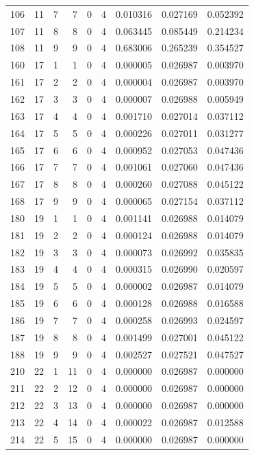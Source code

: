 \begin{longtable}{rrrrrrrrr}
106 & 11 & 7 & 7 & 0 & 4 & 0.010316 & 0.027169 & 0.052392 \\
107 & 11 & 8 & 8 & 0 & 4 & 0.063445 & 0.085449 & 0.214234 \\
108 & 11 & 9 & 9 & 0 & 4 & 0.683006 & 0.265239 & 0.354527 \\
160 & 17 & 1 & 1 & 0 & 4 & 0.000005 & 0.026987 & 0.003970 \\
161 & 17 & 2 & 2 & 0 & 4 & 0.000004 & 0.026987 & 0.003970 \\
162 & 17 & 3 & 3 & 0 & 4 & 0.000007 & 0.026988 & 0.005949 \\
163 & 17 & 4 & 4 & 0 & 4 & 0.001710 & 0.027014 & 0.037112 \\
164 & 17 & 5 & 5 & 0 & 4 & 0.000226 & 0.027011 & 0.031277 \\
165 & 17 & 6 & 6 & 0 & 4 & 0.000952 & 0.027053 & 0.047436 \\
166 & 17 & 7 & 7 & 0 & 4 & 0.001061 & 0.027060 & 0.047436 \\
167 & 17 & 8 & 8 & 0 & 4 & 0.000260 & 0.027088 & 0.045122 \\
168 & 17 & 9 & 9 & 0 & 4 & 0.000065 & 0.027154 & 0.037112 \\
180 & 19 & 1 & 1 & 0 & 4 & 0.001141 & 0.026988 & 0.014079 \\
181 & 19 & 2 & 2 & 0 & 4 & 0.000124 & 0.026988 & 0.014079 \\
182 & 19 & 3 & 3 & 0 & 4 & 0.000073 & 0.026992 & 0.035835 \\
183 & 19 & 4 & 4 & 0 & 4 & 0.000315 & 0.026990 & 0.020597 \\
184 & 19 & 5 & 5 & 0 & 4 & 0.000002 & 0.026987 & 0.014079 \\
185 & 19 & 6 & 6 & 0 & 4 & 0.000128 & 0.026988 & 0.016588 \\
186 & 19 & 7 & 7 & 0 & 4 & 0.000258 & 0.026993 & 0.024597 \\
187 & 19 & 8 & 8 & 0 & 4 & 0.001499 & 0.027001 & 0.045122 \\
188 & 19 & 9 & 9 & 0 & 4 & 0.002527 & 0.027521 & 0.047527 \\
210 & 22 & 1 & 11 & 0 & 4 & 0.000000 & 0.026987 & 0.000000 \\
211 & 22 & 2 & 12 & 0 & 4 & 0.000000 & 0.026987 & 0.000000 \\
212 & 22 & 3 & 13 & 0 & 4 & 0.000000 & 0.026987 & 0.000000 \\
213 & 22 & 4 & 14 & 0 & 4 & 0.000022 & 0.026987 & 0.012588 \\
214 & 22 & 5 & 15 & 0 & 4 & 0.000000 & 0.026987 & 0.000000 \\

\end{longtable}
